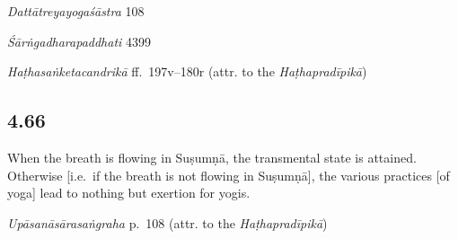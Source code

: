 \begin{ekdosis}
\begin{translation}[hp04_065]
\end{translation}

\begin{sources}[hp04_065]
\emph{Dattātreyayogaśāstra} 108
\begin{versinnote}
\end{versinnote}
\end{sources}

\begin{testimonia}[hp04_065]
\emph{Śārṅgadharapaddhati} 4399
\begin{versinnote}
\end{versinnote}

\emph{Haṭhasaṅketacandrikā} ff.~197v–180r (attr. to the \emph{Haṭhapradīpikā})
\begin{versinnote}
\end{versinnote}
\end{testimonia}


\subsection*{4.66}
\begin{translation}[hp04_066]
When the breath is flowing in Suṣumṇā, the transmental state is attained. Otherwise [i.e.~if the breath is not flowing in Suṣumṇā], the various practices [of yoga] lead to nothing but exertion for yogis.
\end{translation}%


\begin{testimonia}[hp04_066]
\emph{Upāsanāsārasaṅgraha} p.~108 (attr. to the \emph{Haṭhapradīpikā})
\begin{versinnote}
\end{versinnote}


\end{testimonia}
\end{ekdosis}
